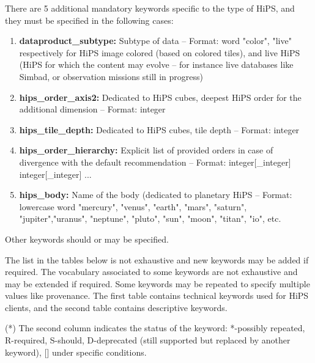 \documentclass[11pt,a4paper]{ivoa}
\begin{document}
\medskip
There are 5 additional mandatory keywords specific to the type of HiPS, and they must be specified in the following cases:
\begin{enumerate}[noitemsep,topsep=0pt,parsep=0pt,partopsep=0pt]
\item {\bf dataproduct\_subtype:} Subtype of data – Format: word "color", "live" respectively for HiPS image colored (based on colored tiles), and live HiPS (HiPS for which the content may evolve – for instance live databases like Simbad, or observation missions still in progress)
\item {\bf hips\_order\_axis2:} Dedicated to HiPS cubes, deepest HiPS order for the additional dimension – Format: integer
\item {\bf hips\_tile\_depth:} Dedicated to HiPS cubes, tile depth – Format: integer
\item {\bf hips\_order\_hierarchy:}  Explicit list of provided orders in case of divergence with the default recommendation – Format: integer[\_integer] integer[\_integer] ... 
\item {\bf hips\_body:}  Name of the body (dedicated to planetary HiPS – Format: lowercase word  "mercury", "venus", "earth", "mars", "saturn", "jupiter","uranus", "neptune", "pluto", "sun", "moon", "titan", "io", etc.
\end{enumerate}

\medskip
Other keywords should or may be specified. 

The list in the tables below is not exhaustive and new keywords may be added if required. The vocabulary associated to some keywords are not exhaustive and may be extended if required. Some keywords may be repeated to specify multiple values like provenance. The first table contains technical keywords used for HiPS clients, and the second table contains descriptive keywords.

(*) The second column indicates the status of the keyword: *-possibly repeated, R-required, S-should,  D-deprecated (still supported but replaced by another keyword), [] under specific conditions.
\end{document}
